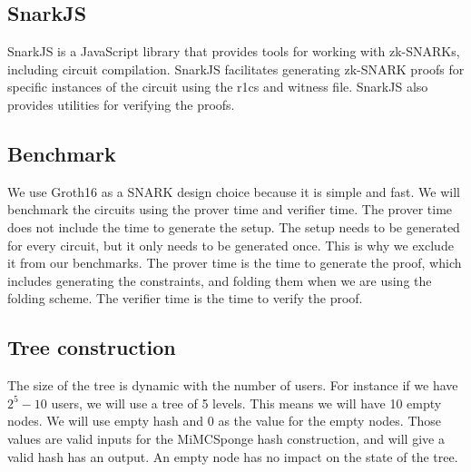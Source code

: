 \subsection{SnarkJS} 

SnarkJS is a JavaScript library that provides tools for working with zk-SNARKs, including circuit compilation.
SnarkJS facilitates generating zk-SNARK proofs for specific instances of the circuit using the r1cs and witness file.
SnarkJS also provides utilities for verifying the proofs.



\subsection{Benchmark} 
We use Groth16 as a SNARK design choice because it is simple and fast. 
We will benchmark the circuits using the prover time and verifier time. The prover time does not include the time to generate the setup.
The setup needs to be generated for every circuit, but it only needs to be generated once. This is why we exclude it from our benchmarks.
The prover time is the time to generate the proof, which includes generating the constraints, and folding them when we are using the folding scheme. 
The verifier time is the time to verify the proof.


\subsection{Tree construction}

The size of the tree is dynamic with the number of users. For instance if we have $2^5 - 10$ users, we will use a tree of 5 levels. This means we will
have 10 empty nodes. We will use empty hash and 0 as the value for the empty nodes. Those values are valid inputs for the MiMCSponge hash construction,
and will give a valid hash has an output. An empty node has no impact on the state of the tree.


